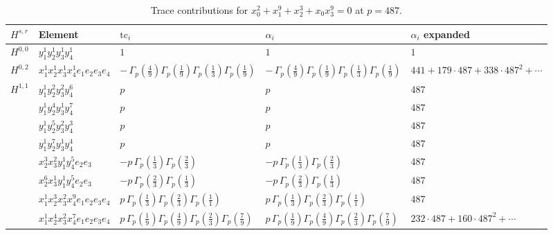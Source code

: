 \documentclass[11pt]{article}
\begin{document}
\begin{table}[ht]
\centering
\caption{Trace contributions for $x_0^{2} + x_1^{9} + x_2^{3} + x_0 x_3^{9} = 0$ at $p=487$.}\label{tab:deformed-47}
\renewcommand{\arraystretch}{1.1}
{\scriptsize
\begin{tabular}{@{}lllll@{}}
\toprule
$H^{s,r}$ & Element & $\mathrm{tc}_i$ & $\alpha_i$ & $\alpha_i$ expanded \\
\midrule
$H^{0,0}$ & $y_{1}^{1} y_{2}^{1} y_{3}^{1} y_{4}^{1}$ & $1$ & $1$ & $1$ \\
\midrule
$H^{0,2}$ & $x_{1}^{1} x_{2}^{1} x_{3}^{1} x_{4}^{1}  e_{1} e_{2} e_{3} e_{4}$ & $- \, \Gamma_p \left( \frac{4}{9} \right) \Gamma_p \left( \frac{1}{9} \right) \Gamma_p \left( \frac{1}{3} \right) \Gamma_p \left( \frac{1}{9} \right)$ & $- \, \Gamma_p \left( \frac{4}{9} \right) \Gamma_p \left( \frac{1}{9} \right) \Gamma_p \left( \frac{1}{3} \right) \Gamma_p \left( \frac{1}{9} \right)$ & $441{+}179{\cdot}487{+}338{\cdot}487^{2}{+}\cdots$ \\
\midrule
$H^{1,1}$ & $y_{1}^{1} y_{2}^{2} y_{3}^{2} y_{4}^{6}$ & $p \,$ & $p \,$ & $487$ \\
 & $y_{1}^{1} y_{2}^{4} y_{3}^{1} y_{4}^{7}$ & $p \,$ & $p \,$ & $487$ \\
 & $y_{1}^{1} y_{2}^{5} y_{3}^{2} y_{4}^{3}$ & $p \,$ & $p \,$ & $487$ \\
 & $y_{1}^{1} y_{2}^{7} y_{3}^{1} y_{4}^{4}$ & $p \,$ & $p \,$ & $487$ \\
 & $x_{2}^{3} x_{3}^{2} y_{1}^{1} y_{4}^{5} e_{2} e_{3}$ & $- p \, \Gamma_p \left( \frac{1}{3} \right) \Gamma_p \left( \frac{2}{3} \right)$ & $- p \, \Gamma_p \left( \frac{1}{3} \right) \Gamma_p \left( \frac{2}{3} \right)$ & $487$ \\
 & $x_{2}^{6} x_{3}^{1} y_{1}^{1} y_{4}^{5} e_{2} e_{3}$ & $- p \, \Gamma_p \left( \frac{2}{3} \right) \Gamma_p \left( \frac{1}{3} \right)$ & $- p \, \Gamma_p \left( \frac{2}{3} \right) \Gamma_p \left( \frac{1}{3} \right)$ & $487$ \\
 & $x_{1}^{1} x_{2}^{3} x_{3}^{2} x_{4}^{9}  e_{1} e_{2} e_{3} e_{4}$ & $p \, \Gamma_p \left( \frac{1}{3} \right) \Gamma_p \left( \frac{2}{3} \right) \Gamma_p \left( \frac{1}{1} \right)$ & $p \, \Gamma_p \left( \frac{1}{3} \right) \Gamma_p \left( \frac{2}{3} \right) \Gamma_p \left( \frac{1}{1} \right)$ & $487$ \\
 & $x_{1}^{1} x_{2}^{4} x_{3}^{2} x_{4}^{7}  e_{1} e_{2} e_{3} e_{4}$ & $p \, \Gamma_p \left( \frac{1}{9} \right) \Gamma_p \left( \frac{4}{9} \right) \Gamma_p \left( \frac{2}{3} \right) \Gamma_p \left( \frac{7}{9} \right)$ & $p \, \Gamma_p \left( \frac{1}{9} \right) \Gamma_p \left( \frac{4}{9} \right) \Gamma_p \left( \frac{2}{3} \right) \Gamma_p \left( \frac{7}{9} \right)$ & $232{\cdot}487{+}160{\cdot}487^{2}{+}\cdots$ \\

\end{tabular}}
\end{table}
\end{document}
